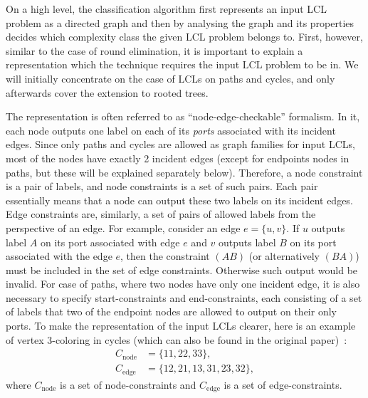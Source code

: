 On a high level, the classification algorithm first represents an input LCL problem as
a directed graph and then by analysing the graph and its properties decides
which complexity class the given LCL problem belongs to. First, however, similar to
the case of round elimination, it is important to explain a representation which
the technique requires the input LCL problem to be in. We will initially concentrate on the case
of LCLs on paths and cycles, and only afterwards cover the extension to rooted trees.

The representation is often referred to as ``node-edge-checkable'' formalism.
In it, each node outputs one label on each of its \emph{ports} associated with
its incident edges. Since only paths and cycles are allowed as graph families for
input LCLs, most of the nodes have exactly 2 incident edges (except for endpoints nodes
in paths, but these will be explained separately below). Therefore, a node constraint
is a pair of labels, and node constraints is a set of such pairs. Each pair essentially
means that a node can output these two labels on its incident edges. Edge constraints are,
similarly, a set of pairs of allowed labels from the perspective of an edge. For example,
consider an edge $e = \{u, v\}$. If $u$ outputs label $A$ on its port associated with edge $e$
and $v$ outputs label $B$ on its port associated with the edge $e$, then the constraint $(AB)$
(or alternatively $(BA)$) must be included in the set of edge constraints. Otherwise such output
would be invalid. For case of paths, where two nodes have only one incident edge, it is also
necessary to specify start-constraints and end-constraints, each consisting of a set of labels
that two of the endpoint nodes are allowed to output on their only ports. To make the
representation of the input LCLs clearer, here is an example of vertex 3-coloring in cycles
(which can also be found in the original paper)~\cite{Chang2020}:
\begin{align*}
  C_{\textrm{node}} &= \{ 11, 22, 33 \}, \\
  C_{\textrm{edge}} &= \{ 12, 21, 13, 31, 23, 32 \},
\end{align*}
where $C_{\textrm{node}}$ is a set of node-constraints and $C_{\textrm{edge}}$ is a set of edge-constraints.

